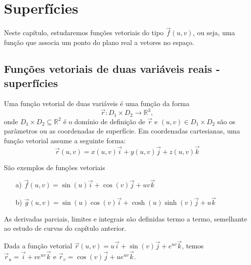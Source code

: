 \chapter{Superfícies}
Neste capítulo, estudaremos funções vetoriais do tipo $\vec{f}(u,v)$, ou seja, uma função que associa um ponto do plano real a vetores no espaço.
\section{Funções vetoriais de duas variáveis reais - superfícies}
Uma função vetorial de duas variáveis é uma função da forma $$\vec{r}:D_1\times D_2 \to \mathbb{R}^3,$$ onde $D_1\times D_2\subseteq \mathbb{R}^2$ é o domínio de definição de $\vec{r}$ e $(u,v)\in D_1\times D_2$ são os parâmetros ou as coordenadas de superfície. Em coordenadas cartesianas, uma função vetorial assume a seguinte forma:
$$\vec{r}(u,v)=x(u,v)\vec{i}+y(u,v)\vec{j}+z(u,v)\vec{k}$$
\begin{ex}\label{exfv_1} São exemplos de funções vetoriais
\begin{itemize}
\item [a)] $\vec{f}(u,v)=\sin(u)\vec{i}+\cos(v)\vec{j}+uv\vec{k}$
\item [b)] $\vec{g}(u,v)=\sin(u)\cos(v) \vec{i}+\cosh(u)\sinh(v)\vec{j}+u\vec{k}$
\end{itemize}
\end{ex}

As derivadas parciais, limites e integrais são definidas termo a termo, semelhante ao estudo de curvas do capítulo anterior. 
\begin{ex}
 Dada a função vetorial $\vec{r}(u,v)=u\vec{i}+\sin(v)\vec{j}+e^{uv}\vec{k}$, temos $\vec{r}_u=\vec{i}+ve^{uv}\vec{k}$ e $\vec{r}_v=\cos(v)\vec{j}+ue^{uv}\vec{k}$.
\end{ex}


